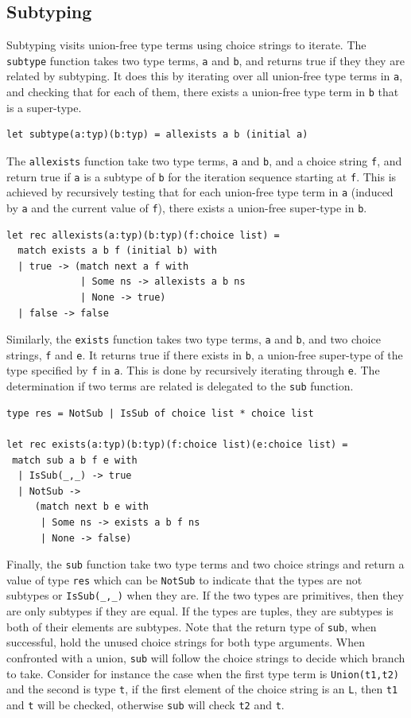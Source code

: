 \documentclass[a4paper,english]{lipics-v2019}
\renewcommand{\L}{{\tt L}\xspace}
\renewcommand{\c}[1]{\lstinline{#1}\xspace}
\begin{document}
\subsection{Subtyping}

Subtyping visits union-free type terms using choice strings to iterate.  The
\c{subtype} function takes two type terms, \c a and \c b, and returns true
if they they are related by subtyping. It does this by iterating over all
union-free type terms in \c a, and checking that for each of them, there
exists a union-free type term in \c b that is a super-type.

\begin{lstlisting}
let subtype(a:typ)(b:typ) = allexists a b (initial a)
\end{lstlisting}

The \c{allexists} function take two type terms, \c a and \c b, and a choice
string \c f, and return true if \c a is a subtype of \c b for the iteration
sequence starting at \c f. This is achieved by recursively testing that for
each union-free type term in \c a (induced by \c a and the current value of
\c f), there exists a union-free super-type in \c b.

\begin{lstlisting}
let rec allexists(a:typ)(b:typ)(f:choice list) =
  match exists a b f (initial b) with 
  | true -> (match next a f with
             | Some ns -> allexists a b ns 
             | None -> true) 
  | false -> false
\end{lstlisting}

Similarly, the \c{exists} function takes two type terms, \c a and \c b, and
two choice strings, \c f and \c e. It returns true if there exists in \c b, a
union-free super-type of the type specified by \c f in \c a. This is done by
recursively iterating through \c e. The determination if two terms are
related is delegated to the \c{sub} function.

\begin{lstlisting}
type res = NotSub | IsSub of choice list * choice list

let rec exists(a:typ)(b:typ)(f:choice list)(e:choice list) =
 match sub a b f e with 
  | IsSub(_,_) -> true 
  | NotSub -> 
     (match next b e with
      | Some ns -> exists a b f ns 
      | None -> false) 
\end{lstlisting}

Finally, the \c{sub} function take two type terms and two choice strings and
return a value of type \c{res} which can be \c{NotSub} to indicate that the
types are not subtypes or \c{IsSub(_,_)} when they are.  If the two types
are primitives, then they are only subtypes if they are equal.  If the types
are tuples, they are subtypes is both of their elements are subtypes. Note
that the return type of \c{sub}, when successful, hold the unused choice
strings for both type arguments. When confronted with a union, \c{sub} will
follow the choice strings to decide which branch to take. Consider for
instance the case when the first type term is \c{Union(t1,t2)} and the
second is type \c{t}, if the first element of the choice string is an \L,
then \c{t1} and \c{t} will be checked, otherwise \c{sub} will check \c{t2}
and \c{t}.
\end{document}
